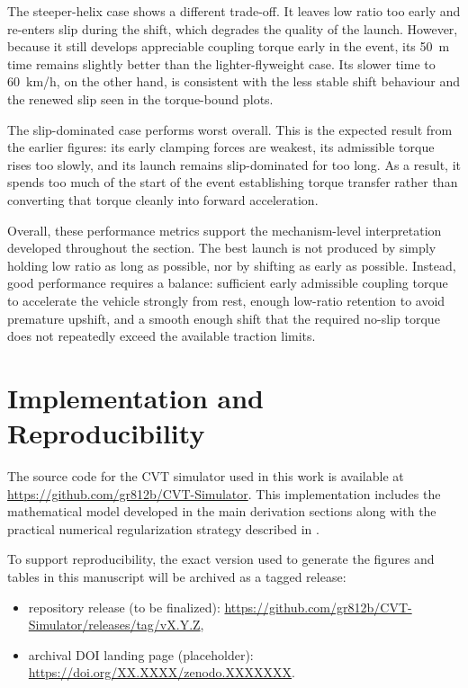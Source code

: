\documentclass[11pt]{article}
\numberwithin{equation}{section}
\begin{document}
The steeper-helix case shows a different trade-off. It leaves low ratio too
early and re-enters slip during the shift, which degrades the quality of the
launch. However, because it still develops appreciable coupling torque early in
the event, its \SI{50}{m} time remains slightly better than the
lighter-flyweight case. Its slower time to \SI{60}{km/h}, on the other hand, is
consistent with the less stable shift behaviour and the renewed slip seen in
the torque-bound plots.

The slip-dominated case performs worst overall. This is the expected result from
the earlier figures: its early clamping forces are weakest, its admissible
torque rises too slowly, and its launch remains slip-dominated for too long.
As a result, it spends too much of the start of the event establishing torque
transfer rather than converting that torque cleanly into forward acceleration.

Overall, these performance metrics support the mechanism-level interpretation
developed throughout the section. The best launch is not produced by simply
holding low ratio as long as possible, nor by shifting as early as possible.
Instead, good performance requires a balance: sufficient early admissible
coupling torque to accelerate the vehicle strongly from rest, enough low-ratio
retention to avoid premature upshift, and a smooth enough shift that the
required no-slip torque does not repeatedly exceed the available traction
limits.

\section{Implementation and Reproducibility}
\label{sec:implementation-and-reproducibility}

The source code for the CVT simulator used in this work is available at
\url{https://github.com/gr812b/CVT-Simulator}.
This implementation includes the mathematical model developed in the main
derivation sections along with the practical numerical regularization strategy
described in .

To support reproducibility, the exact version used to generate the figures and
tables in this manuscript will be archived as a tagged release:
\begin{itemize}
    \item repository release (to be finalized):
      \url{https://github.com/gr812b/CVT-Simulator/releases/tag/vX.Y.Z},
    \item archival DOI landing page (placeholder):
      \url{https://doi.org/XX.XXXX/zenodo.XXXXXXX}.
\end{itemize}
\end{document}
